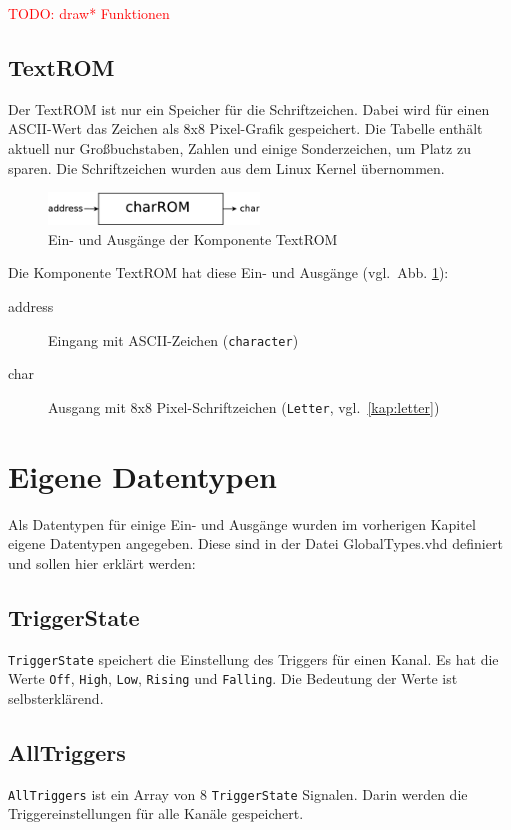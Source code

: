 \documentclass[IN,ngerman,utf8,12pt]{tumbook}
\newcommand\todo[1]{\textcolor{red}{TODO: #1}}
\newcommand{\vgl}{vgl.\ }
\begin{document}
\todo{draw* Funktionen}

\subsection{TextROM}

Der TextROM ist nur ein Speicher für die Schriftzeichen.
Dabei wird für einen ASCII-Wert das Zeichen als 8x8 Pixel-Grafik gespeichert.
Die Tabelle enthält aktuell nur Großbuchstaben, Zahlen und einige Sonderzeichen, um Platz zu sparen.
Die Schriftzeichen wurden aus dem Linux Kernel übernommen.

\begin{figure}[H]
    \centerline{
        \includegraphics[width=0.5\textwidth]{img/textROM}
    }
    \label{abb:textrom}
    \caption{Ein- und Ausgänge der Komponente TextROM}
\end{figure}

Die Komponente TextROM hat diese Ein- und Ausgänge (\vgl Abb. \ref{abb:textrom}):
\begin{description}
    \item[address] Eingang mit ASCII-Zeichen (\texttt{character})
    \item[char] Ausgang mit 8x8 Pixel-Schriftzeichen (\texttt{Letter}, \vgl \ref{kap:letter})
\end{description}

\section{Eigene Datentypen}
Als Datentypen für einige Ein- und Ausgänge wurden im vorherigen Kapitel eigene Datentypen angegeben.
Diese sind in der Datei GlobalTypes.vhd definiert und sollen hier erklärt werden:

\subsection{TriggerState}
\label{kap:triggerstate}
\texttt{TriggerState} speichert die Einstellung des Triggers für einen Kanal.
Es hat die Werte \texttt{Off}, \texttt{High}, \texttt{Low}, \texttt{Rising} und \texttt{Falling}.
Die Bedeutung der Werte ist selbsterklärend.

\subsection{AllTriggers}
\label{kap:alltriggers}
\texttt{AllTriggers} ist ein Array von 8 \texttt{TriggerState} Signalen.
Darin werden die Triggereinstellungen für alle Kanäle gespeichert.
\end{document}
